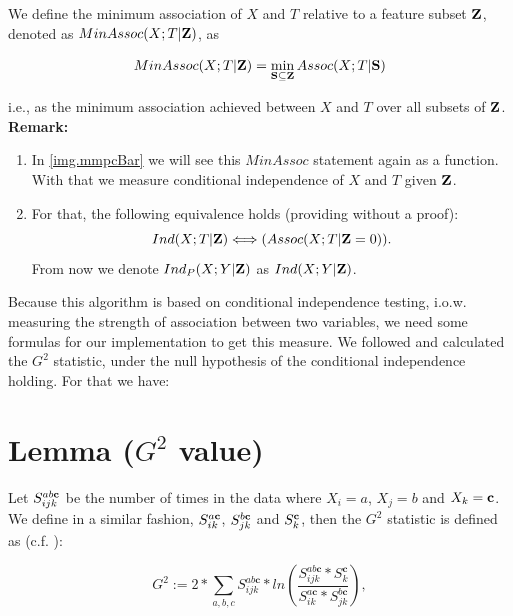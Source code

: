 		We define the minimum association of $X$ and $T$ relative to a feature subset ${\textbf{Z}}$, denoted as $MinAssoc(X; T | {\textbf{Z}})$, as

		\begin{equation}
			MinAssoc (X; T | {\textbf{Z}}) = \min_{{\textbf{S}} \subseteq {\textbf{Z}}} Assoc(X; T | {\textbf{S}}) \label{eq.Def9}
		\end{equation}

		i.e., as the minimum association achieved between $X$ and $T$ over all subsets of ${\textbf{Z}}$. \\
		\textbf{Remark:}
		\begin{enumerate}
			\item In \autoref{img.mmpcBar} we will see this $MinAssoc$ statement again as a function. With that we measure conditional independence of $X$ and $T$ given ${\textbf{Z}}$.
			\item For that, the following equivalence holds (providing without a proof): 
				\begin{equation}
					Ind(X; T | {\textbf{Z}}) \Longleftrightarrow (Assoc(X; T | {\textbf{Z}} = 0)).
				\end{equation}
				From now we denote $Ind_{P}(X; Y | {\textbf{Z}})$ as $Ind(X; Y | {\textbf{Z}})$.
		\end{enumerate}

	Because this algorithm is based on conditional independence testing, i.o.w. measuring the strength of association between two variables, we need some formulas for our implementation to get this measure. We followed \cite{SGSN} and calculated the $G^{2}$ statistic, under the null hypothesis of the conditional independence holding. For that we have:\\

	\section*{Lemma ($G^{2}$ value)} \label{s.g2}

		Let $S_{ijk}^{ab{\textbf{c}}}$ be the number of times in the data where $X_{i} = a$, $X_{j} = b$ and $X_{k} = {\textbf{c}}$. We define in a similar fashion, $S_{ik}^{a{\textbf{c}}}$, $S_{jk}^{b{\textbf{c}}}$  and $S_{k}^{{\textbf{c}}}$, then the $G^{2}$ statistic is defined as (c.f. \cite{SGSN}):

		\begin{equation}
			G^{2} := 2 * \sum_{a,b,c} S^{ab\textbf{c}}_{ijk} * ln \left( \frac{S^{ab\textbf{c}}_{ijk}*S^{\textbf{c}}_{k}}{S^{a\textbf{c}}_{ik}*S^{b\textbf{c}}_{jk}} \right),
		\end{equation}


